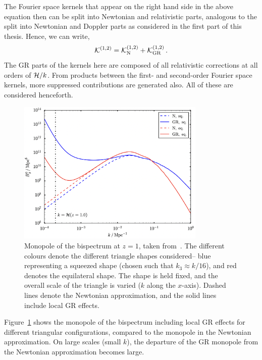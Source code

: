 The Fourier space kernels that appear on the right hand side in the above equation then can be split into Newtonian and relativistic parts, analogous to the split into Newtonian and Doppler parts as considered in the first part of this thesis. Hence, we can write, 
\begin{equation}
	\mathcal{K}^{(1,2)} = \mathcal{K}^{(1,2)}_{\mathrm{N}} + \mathcal{K}^{(1,2)}_{\mathrm{GR}}\,.
\end{equation}
The GR parts of the kernels here are composed of all relativistic corrections at all orders of $\mathcal{H}/k$. From products between the first- and second-order Fourier space kernels, more suppressed contributions are generated also. All of these are considered henceforth.

\begin{figure}[!ht]
	\centering
	\includegraphics[width=0.8\textwidth]{fig/sj_monopole_bg.png}
	\caption{Monopole of the bispectrum at $z = 1$, taken from~\cite{Umeh:2016nuh}. The different colours denote the different triangle shapes considered-- blue representing a squeezed shape (chosen such that $k_3 \approx k/16$), and red denotes the equilateral shape. The shape is held fixed, and the overall scale of the triangle is varied ($k$ along the $x$-axis). Dashed lines denote the Newtonian approximation, and the solid lines include local GR effects.}
	\label{fig:sj_bgmono}
\end{figure}

Figure~\ref{fig:sj_bgmono} shows the monopole of the bispectrum including local GR effects for different triangular configurations, compared to the monopole in the Newtonian approximation. On large scales (small $k$), the departure of the GR monopole from the Newtonian approximation becomes large.

